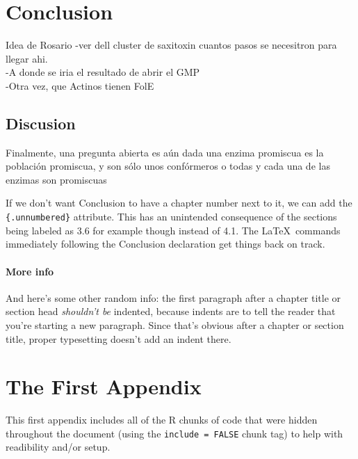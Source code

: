 \documentclass[]{article}
\title{}
\author{}
\date{}
\let\oldparagraph\paragraph
\renewcommand{\paragraph}[1]{\oldparagraph{#1}\mbox{}}
\begin{document}
\section*{Conclusion}\label{conclusion}

\setcounter{chapter}{4} \setcounter{section}{0}

Idea de Rosario -ver dell cluster de saxitoxin cuantos pasos se
necesitron para llegar ahi.\\
-A donde se iria el resultado de abrir el GMP\\
-Otra vez, que Actinos tienen FolE

\subsection{Discusion}\label{discusion}

Finalmente, una pregunta abierta es aún dada una enzima promiscua es la
población promiscua, y son sólo unos confórmeros o todas y cada una de
las enzimas son promiscuas

If we don't want Conclusion to have a chapter number next to it, we can
add the \texttt{\{.unnumbered\}} attribute. This has an unintended
consequence of the sections being labeled as 3.6 for example though
instead of 4.1. The \LaTeX~commands immediately following the Conclusion
declaration get things back on track.

\paragraph{More info}\label{more-info}

And here's some other random info: the first paragraph after a chapter
title or section head \emph{shouldn't be} indented, because indents are
to tell the reader that you're starting a new paragraph. Since that's
obvious after a chapter or section title, proper typesetting doesn't add
an indent there.

\appendix

\section{The First Appendix}\label{the-first-appendix}

This first appendix includes all of the R chunks of code that were
hidden throughout the document (using the \texttt{include\ =\ FALSE}
chunk tag) to help with readibility and/or setup.
\end{document}
